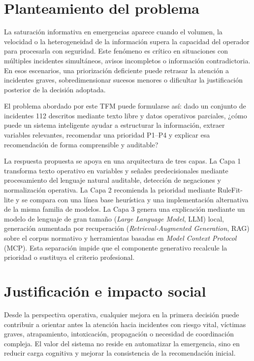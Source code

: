 \section{Planteamiento del problema}

La saturación informativa en emergencias aparece cuando el volumen, la velocidad o la heterogeneidad de la información supera la capacidad del operador para procesarla con seguridad. Este fenómeno es crítico en situaciones con múltiples incidentes simultáneos, avisos incompletos o información contradictoria. En esos escenarios, una priorización deficiente puede retrasar la atención a incidentes graves, sobredimensionar sucesos menores o dificultar la justificación posterior de la decisión adoptada.

El problema abordado por este TFM puede formularse así: dado un conjunto de incidentes 112 descritos mediante texto libre y datos operativos parciales, ¿cómo puede un sistema inteligente ayudar a estructurar la información, extraer variables relevantes, recomendar una prioridad P1--P4 y explicar esa recomendación de forma comprensible y auditable?

La respuesta propuesta se apoya en una arquitectura de tres capas. La Capa 1 transforma texto operativo en variables y señales predecisionales mediante procesamiento del lenguaje natural auditable, detección de negaciones y normalización operativa. La Capa 2 recomienda la prioridad mediante RuleFit-lite y se compara con una línea base heurística y una implementación alternativa de la misma familia de modelos. La Capa 3 genera una explicación mediante un modelo de lenguaje de gran tamaño (\textit{Large Language Model}, LLM) local, generación aumentada por recuperación (\textit{Retrieval-Augmented Generation}, RAG) sobre el corpus normativo y herramientas basadas en \textit{Model Context Protocol} (MCP). Esta separación impide que el componente generativo recalcule la prioridad o sustituya el criterio profesional.

\section{Justificación e impacto social}

Desde la perspectiva operativa, cualquier mejora en la primera decisión puede contribuir a orientar antes la atención hacia incidentes con riesgo vital, víctimas graves, atrapamiento, intoxicación, propagación o necesidad de coordinación compleja. El valor del sistema no reside en automatizar la emergencia, sino en reducir carga cognitiva y mejorar la consistencia de la recomendación inicial.

